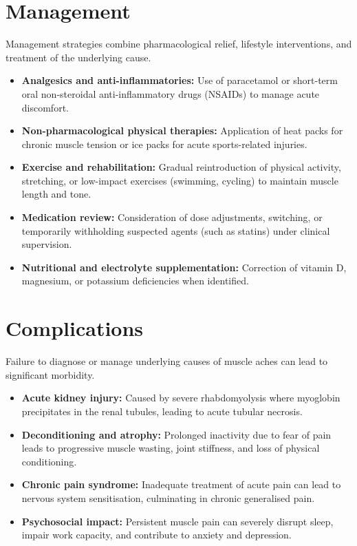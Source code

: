 \section*{Management}
Management strategies combine pharmacological relief, lifestyle interventions, and treatment of the underlying cause.
\begin{itemize}
    \item \textbf{Analgesics and anti-inflammatories:} Use of paracetamol or short-term oral non-steroidal anti-inflammatory drugs (NSAIDs) to manage acute discomfort.
    \item \textbf{Non-pharmacological physical therapies:} Application of heat packs for chronic muscle tension or ice packs for acute sports-related injuries.
    \item \textbf{Exercise and rehabilitation:} Gradual reintroduction of physical activity, stretching, or low-impact exercises (swimming, cycling) to maintain muscle length and tone.
    \item \textbf{Medication review:} Consideration of dose adjustments, switching, or temporarily withholding suspected agents (such as statins) under clinical supervision.
    \item \textbf{Nutritional and electrolyte supplementation:} Correction of vitamin D, magnesium, or potassium deficiencies when identified.
\end{itemize}

\section*{Complications}
Failure to diagnose or manage underlying causes of muscle aches can lead to significant morbidity.
\begin{itemize}
    \item \textbf{Acute kidney injury:} Caused by severe rhabdomyolysis where myoglobin precipitates in the renal tubules, leading to acute tubular necrosis.
    \item \textbf{Deconditioning and atrophy:} Prolonged inactivity due to fear of pain leads to progressive muscle wasting, joint stiffness, and loss of physical conditioning.
    \item \textbf{Chronic pain syndrome:} Inadequate treatment of acute pain can lead to nervous system sensitisation, culminating in chronic generalised pain.
    \item \textbf{Psychosocial impact:} Persistent muscle pain can severely disrupt sleep, impair work capacity, and contribute to anxiety and depression.
\end{itemize}

